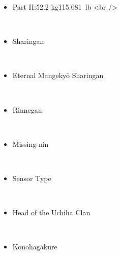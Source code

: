 \documentclass[a4paper,12pt]{article}
\begin{document}
\begin{itemize}
\item Part II:52.2  kg115.081 lb <br />
\end{itemize}\\ \par \vspace{0.5cm}

\begin{itemize}
\item Sharingan
\end{itemize}\\ \par \vspace{0.5cm}

\begin{itemize}
\item Eternal Mangekyō Sharingan
\end{itemize}\\ \par \vspace{0.5cm}

\begin{itemize}
\item Rinnegan
\end{itemize}\\ \par \vspace{0.5cm}

\begin{itemize}
\item Missing-nin
\end{itemize}\\ \par \vspace{0.5cm}

\begin{itemize}
\item Sensor Type
\end{itemize}\\ \par \vspace{0.5cm}

\begin{itemize}
\item Head of the Uchiha Clan
\end{itemize}\\ \par \vspace{0.5cm}

\begin{itemize}
\item Konohagakure
\end{itemize}\\ \par \vspace{0.5cm}
\end{document}
